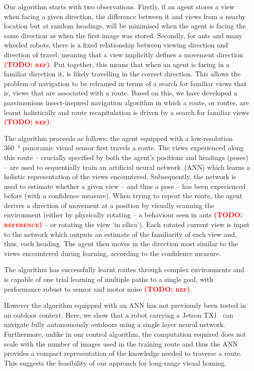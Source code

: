 \documentclass[letterpaper]{article}
\newcommand{\todo}[1]{\textbf{\textsc{\textcolor{red}{(TODO: #1)}}}}
\begin{document}
Our algorithm starts with two observations. 
Firstly, if an agent stores a view when facing a given direction, the difference between it and views from a nearby location but at random headings, will be minimised when the agent is facing the same direction as when the first image was stored. 
Secondly, for ants and many wheeled robots, there is a ﬁxed relationship between viewing direction and direction of travel, meaning that a view implicitly defines a movement direction \todo{ref}. 
Put together, this means that when an agent is facing in a familiar direction it, is likely travelling in the correct direction. 
This allows the problem of navigation to be reframed in terms of a search for familiar views that is, views that are associated with a route. 
Based on this, we have developed a parsimonious insect-inspired navigation algorithm in which a route, or routes, are learnt holistically and route recapitulation is driven by a search for familiar views \todo{ref}. 

The algorithm proceeds as follows: the agent equipped with a low-resolution \SI{360}{\degree} panoramic visual sensor first travels a route. 
The views experienced along this route -- crucially specified by both the agent’s positions and headings (poses) -- are used to sequentially train an artificial neural network~(ANN) which learns a holistic representation of the views encountered. Subsequently, the network is used to estimate whether a given view -- and thus a pose -- has been experienced before (with a confidence measure). When trying to repeat the route, the agent derives a direction of movement at a position by visually scanning the environment (either by physically rotating -- a behaviour seen in ants \todo{reference} -- or rotating the view `in silica').
Each rotated current view is input to the network which outputs an estimate of the familiarity of each view and, thus, each heading. 
The agent then moves in the direction most similar to the views encountered during learning, according to the confidence measure. 

The algorithm has successfully learnt routes through complex environments and is capable of one trial learning of multiple paths to a single goal, with performance robust to sensor and motor noise \todo{ref}.  

However the algorithm equipped with an ANN has not previously been tested in an outdoor context. 
Here, we show that a robot carrying a Jetson TX1~\citep{NVIDIACorporation2016} can navigate fully autonomously outdoors using a single layer neural network. 
Furthermore, unlike in our control algorithm, the computation required does not scale with the number of images used in the training route and thus the ANN provides a compact representation of the knowledge needed to traverse a route. 
This suggests the feasibility of our approach for long-range visual homing.
\end{document}
